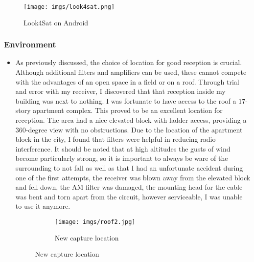 \documentclass{article}
\begin{document}
\begin{itemize}
                \begin{figure}[H]
                    \centering
                    \texttt{[image: imgs/look4sat.png]}
                    \caption{Look4Sat on Android}
                    \label{img:look4sat}
                \end{figure}
                
            \end{itemize}
        \subsubsection{Environment}
            \begin{itemize}
                \item[] As previously discussed, the choice of location for good reception is crucial. Although additional filters and amplifiers can be used, these cannot compete with the advantages of an open space in a field or on a roof. Through trial and error with my receiver, I discovered that that reception inside my building was next to nothing. I was fortunate to have access to the roof a 17-story apartment complex. This proved to be an excellent location for reception. The area had a nice elevated block with ladder access, providing a 360-degree view with no obstructions. Due to the location of the apartment block in the city, I found that filters were helpful in reducing radio interference. It should be noted that at high altitudes the gusts of wind become particularly strong, so it is important to always be ware of the surrounding to not fall as well as that I had an unfortunate accident during one of the first attempts, the receiver was blown away from the elevated block and fell down, the AM filter was damaged, the mounting head for the cable was bent and torn apart from the circuit, however serviceable, I was unable to use it anymore. 

                \begin{figure}[H]
                    \centering
                    \begin{subfigure}{0.3\textwidth}
                        \centering
                        \texttt{[image: imgs/roof2.jpg]}
                        \caption{New capture location}
                        \label{fig:roof2}
                    \end{subfigure}
                \end{figure}
            \end{itemize}
\end{document}
